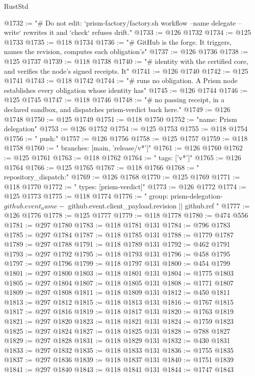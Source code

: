 \begin{lexlean}{RustStd}
\begin{coremodule}
@1732 := "# Do not edit: `prism-factory/factory.sh workflow --name delegate --write` rewrites it and `check` refuses drift."
@1733 := @126 @1732
@1734 := @125 @1733
@1735 := @118 @1734
@1736 := "# GitHub is the forge. It triggers, names the revision, computes each obligation's"
@1737 := @126 @1736
@1738 := @125 @1737
@1739 := @118 @1738
@1740 := "# identity with the certified core, and verifies the node's signed receipts. It"
@1741 := @126 @1740
@1742 := @125 @1741
@1743 := @118 @1742
@1744 := "# runs no obligation. A Prism node establishes every obligation whose identity has"
@1745 := @126 @1744
@1746 := @125 @1745
@1747 := @118 @1746
@1748 := "# no passing receipt, in a declared sandbox, and dispatches prism-verdict back here."
@1749 := @126 @1748
@1750 := @125 @1749
@1751 := @118 @1750
@1752 := "name: Prism delegation"
@1753 := @126 @1752
@1754 := @125 @1753
@1755 := @118 @1754
@1756 := "  push:"
@1757 := @126 @1756
@1758 := @125 @1757
@1759 := @118 @1758
@1760 := "    branches: [main, 'release/v*']"
@1761 := @126 @1760
@1762 := @125 @1761
@1763 := @118 @1762
@1764 := "    tags: ['v*']"
@1765 := @126 @1764
@1766 := @125 @1765
@1767 := @118 @1766
@1768 := "  repository_dispatch:"
@1769 := @126 @1768
@1770 := @125 @1769
@1771 := @118 @1770
@1772 := "    types: [prism-verdict]"
@1773 := @126 @1772
@1774 := @125 @1773
@1775 := @118 @1774
@1776 := "  group: prism-delegation-${{ github.event_name }}-${{ github.event.client_payload.revision || github.ref }}"
@1777 := @126 @1776
@1778 := @125 @1777
@1779 := @118 @1778
@1780 := @474 @556
@1781 := @297 @1780
@1783 := @118 @1781 @131
@1784 := @796 @1783
@1785 := @297 @1784
@1787 := @118 @1785 @131
@1788 := @1779 @1787
@1789 := @297 @1788
@1791 := @118 @1789 @131
@1792 := @462 @1791
@1793 := @297 @1792
@1795 := @118 @1793 @131
@1796 := @458 @1795
@1797 := @297 @1796
@1799 := @118 @1797 @131
@1800 := @454 @1799
@1801 := @297 @1800
@1803 := @118 @1801 @131
@1804 := @1775 @1803
@1805 := @297 @1804
@1807 := @118 @1805 @131
@1808 := @1771 @1807
@1809 := @297 @1808
@1811 := @118 @1809 @131
@1812 := @450 @1811
@1813 := @297 @1812
@1815 := @118 @1813 @131
@1816 := @1767 @1815
@1817 := @297 @1816
@1819 := @118 @1817 @131
@1820 := @1763 @1819
@1821 := @297 @1820
@1823 := @118 @1821 @131
@1824 := @1759 @1823
@1825 := @297 @1824
@1827 := @118 @1825 @131
@1828 := @788 @1827
@1829 := @297 @1828
@1831 := @118 @1829 @131
@1832 := @430 @1831
@1833 := @297 @1832
@1835 := @118 @1833 @131
@1836 := @1755 @1835
@1837 := @297 @1836
@1839 := @118 @1837 @131
@1840 := @1751 @1839
@1841 := @297 @1840
@1843 := @118 @1841 @131
@1844 := @1747 @1843

\end{coremodule}
\end{lexlean}
